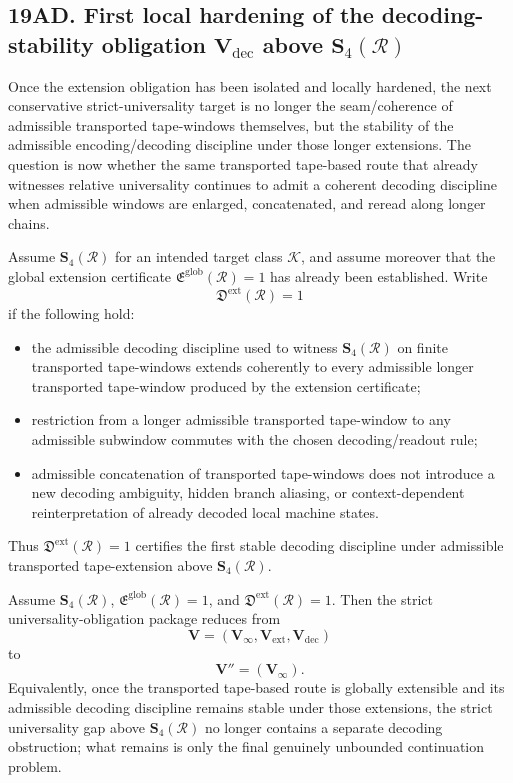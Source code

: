 \subsection*{19AD. First local hardening of the decoding-stability obligation \(\mathbf V_{\mathrm{dec}}\) above \(\mathbf S_4(\mathcal R)\)}
Once the extension obligation has been isolated and locally hardened, the next conservative strict-universality target is no longer the seam/coherence of admissible transported tape-windows themselves, but the stability of the admissible encoding/decoding discipline under those longer extensions. The question is now whether the same transported tape-based route that already witnesses relative universality continues to admit a coherent decoding discipline when admissible windows are enlarged, concatenated, and reread along longer chains.

\begin{definition}
Assume \(\mathbf S_4(\mathcal R)\) for an intended target class \(\mathcal K\), and assume moreover that the global extension certificate \(\mathfrak E^{\mathrm{glob}}(\mathcal R)=1\) has already been established.
Write
\[
\mathfrak D^{\mathrm{ext}}(\mathcal R)=1
\]
if the following hold:
\begin{itemize}[leftmargin=2em]
 \item the admissible decoding discipline used to witness \(\mathbf S_4(\mathcal R)\) on finite transported tape-windows extends coherently to every admissible longer transported tape-window produced by the extension certificate;
 \item restriction from a longer admissible transported tape-window to any admissible subwindow commutes with the chosen decoding/readout rule;
 \item admissible concatenation of transported tape-windows does not introduce a new decoding ambiguity, hidden branch aliasing, or context-dependent reinterpretation of already decoded local machine states.
\end{itemize}
Thus \(\mathfrak D^{\mathrm{ext}}(\mathcal R)=1\) certifies the first stable decoding discipline under admissible transported tape-extension above \(\mathbf S_4(\mathcal R)\).
\end{definition}

\begin{proposition}
Assume \(\mathbf S_4(\mathcal R)\), \(\mathfrak E^{\mathrm{glob}}(\mathcal R)=1\), and \(\mathfrak D^{\mathrm{ext}}(\mathcal R)=1\). Then the strict universality-obligation package reduces from
\[
\mathbf V=(\mathbf V_\infty,\mathbf V_{\mathrm{ext}},\mathbf V_{\mathrm{dec}})
\]
to
\[
\mathbf V''=(\mathbf V_\infty).
\]
Equivalently, once the transported tape-based route is globally extensible and its admissible decoding discipline remains stable under those extensions, the strict universality gap above \(\mathbf S_4(\mathcal R)\) no longer contains a separate decoding obstruction; what remains is only the final genuinely unbounded continuation problem.
\end{proposition}

